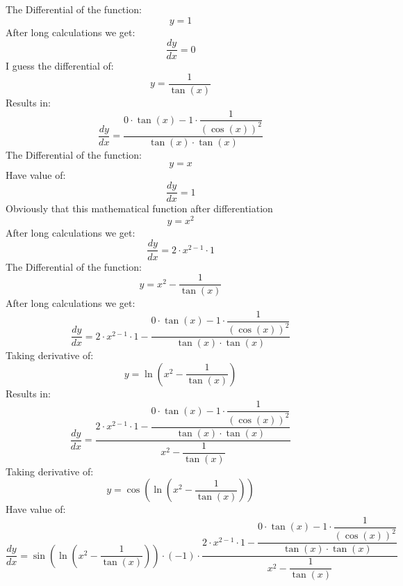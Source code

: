 \documentclass{article}
\begin{document}
\begin{center}
The Differential of the function:
\begin{dmath}
 y = 1
\end{dmath}
After long calculations we get:
\begin{dmath}
 \frac{dy}{dx} = 0
\end{dmath}
I guess the differential of:
\begin{dmath}
 y = \dfrac{1}{\tan (x)}
\end{dmath}
Results in:
\begin{dmath}
 \frac{dy}{dx} = \dfrac{0\cdot \tan (x)-1\cdot \dfrac{1}{(\cos (x))^{2}}}{\tan (x)\cdot \tan (x)}
\end{dmath}
The Differential of the function:
\begin{dmath}
 y = x
\end{dmath}
Have value of:
\begin{dmath}
 \frac{dy}{dx} = 1
\end{dmath}
Obviously that this mathematical function after differentiation
\begin{dmath}
 y = x^{2}
\end{dmath}
After long calculations we get:
\begin{dmath}
 \frac{dy}{dx} = 2\cdot x^{2-1}\cdot 1
\end{dmath}
The Differential of the function:
\begin{dmath}
 y = x^{2}-\dfrac{1}{\tan (x)}
\end{dmath}
After long calculations we get:
\begin{dmath}
 \frac{dy}{dx} = 2\cdot x^{2-1}\cdot 1-\dfrac{0\cdot \tan (x)-1\cdot \dfrac{1}{(\cos (x))^{2}}}{\tan (x)\cdot \tan (x)}
\end{dmath}
Taking derivative of:
\begin{dmath}
 y = \ln (x^{2}-\dfrac{1}{\tan (x)})
\end{dmath}
Results in:
\begin{dmath}
 \frac{dy}{dx} = \dfrac{2\cdot x^{2-1}\cdot 1-\dfrac{0\cdot \tan (x)-1\cdot \dfrac{1}{(\cos (x))^{2}}}{\tan (x)\cdot \tan (x)}}{x^{2}-\dfrac{1}{\tan (x)}}
\end{dmath}
Taking derivative of:
\begin{dmath}
 y = \cos (\ln (x^{2}-\dfrac{1}{\tan (x)}))
\end{dmath}
Have value of:
\begin{dmath}
 \frac{dy}{dx} = \sin (\ln (x^{2}-\dfrac{1}{\tan (x)}))\cdot (-1)\cdot \dfrac{2\cdot x^{2-1}\cdot 1-\dfrac{0\cdot \tan (x)-1\cdot \dfrac{1}{(\cos (x))^{2}}}{\tan (x)\cdot \tan (x)}}{x^{2}-\dfrac{1}{\tan (x)}}

\end{dmath}
\end{center}
\end{document}
